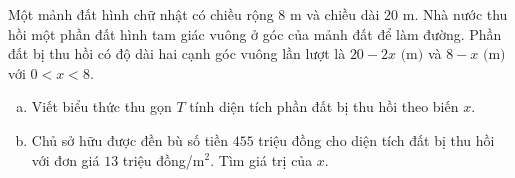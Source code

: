 \begin{bt}%
	Một mảnh đất hình chữ nhật có chiều rộng $8\text{ m}$ và chiều dài $20\text{ m}$. Nhà nước thu hồi một phần đất hình tam giác vuông ở góc của mảnh đất để làm đường. Phần đất bị thu hồi có độ dài hai cạnh góc vuông lần lượt là $20 - 2x\text{ (m)}$ và $8 - x\text{ (m)}$ với $0 < x < 8$.
	\begin{enumerate}[a)]
		\item Viết biểu thức thu gọn $T$ tính diện tích phần đất bị thu hồi theo biến $x$.
		\item Chủ sở hữu được đền bù số tiền $455$ triệu đồng cho diện tích đất bị thu hồi với đơn giá $13$ triệu đồng/$\text{m}^2$. Tìm giá trị của $x$.
	\end{enumerate}
\end{bt}

